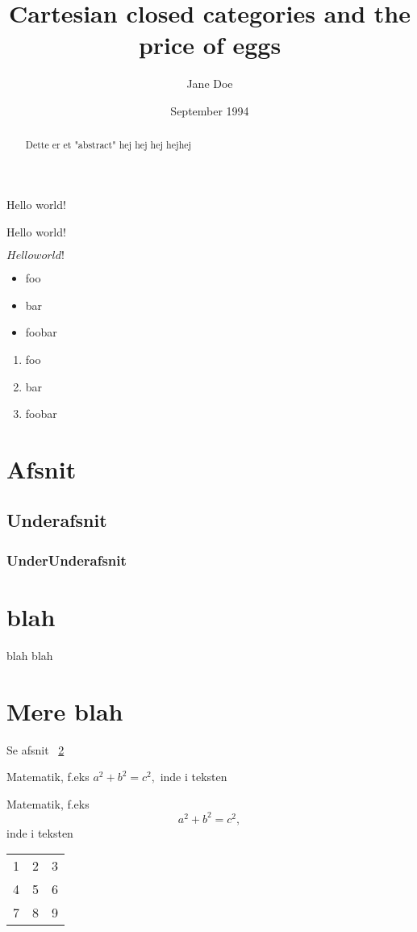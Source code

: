 \documentclass[a4paper]{article}
\begin{document}
\title{Cartesian closed categories and the price of eggs}
\author{Jane Doe}
\date{September 1994}
   \maketitle
   Hello world!

Hello world!

$Hello world!$ %

\begin{itemize}
\item foo
\item bar
\item foobar
\end{itemize}

\begin{enumerate}
\item foo
\item bar
\item foobar
\end{enumerate}

\section{Afsnit}
\subsection{Underafsnit}
\subsubsection{UnderUnderafsnit}

\begin{abstract}
Dette er et "abstract" hej hej hej
hejhej
\end{abstract}

\section{blah}\label{detvigtigeafsnit}
blah blah
\section{Mere blah}
Se afsnit ~\ref{detvigtigeafsnit}

Matematik, f.eks $a^2 + b^2 = c^2,$
inde i teksten

Matematik, f.eks \[a^2 + b^2 = c^2,\] 
inde i teksten

\begin{tabular}{| l | c | r |}
\hline
  1 & 2 & 3 \\
  4 & 5 & 6 \\
  7 & 8 & 9 \\
\hline
\end{tabular}
\end{document}
